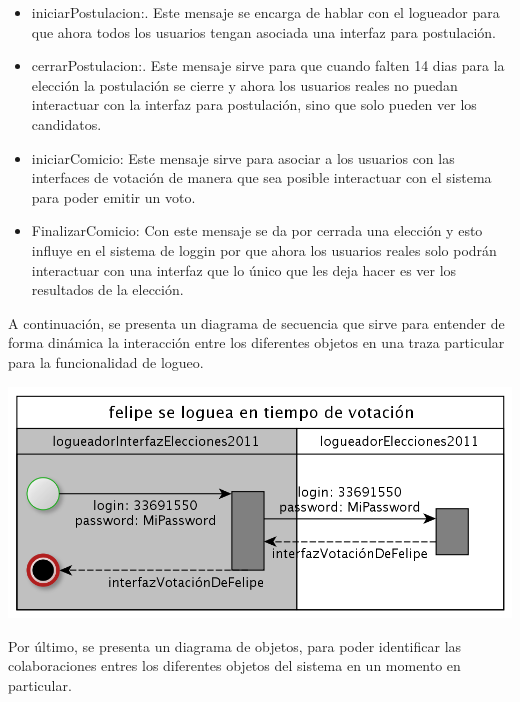 \begin{itemize}
\item iniciarPostulacion:. Este mensaje se encarga de hablar con el logueador para que ahora todos los usuarios tengan asociada una interfaz para postulaci\'on.
\item cerrarPostulacion:. Este mensaje sirve para que cuando falten 14 dias para la elecci\'on la postulaci\'on se cierre y ahora los usuarios reales no puedan interactuar con la interfaz para postulaci\'on, sino que solo pueden ver los candidatos.
\item iniciarComicio: Este mensaje sirve para asociar a los usuarios con las interfaces de votaci\'on de manera que sea posible interactuar con el sistema para poder emitir un voto.
\item FinalizarComicio: Con este mensaje se da por cerrada una elecci\'on y esto influye en el sistema de loggin por que ahora los usuarios reales solo podr\'an interactuar con una interfaz que lo \'unico que les deja hacer es ver los resultados de la elecci\'on. 
\end{itemize}




\bigskip

A continuaci\'on, se presenta un diagrama de secuencia que sirve para entender de forma din\'amica la interacci\'on entre los diferentes objetos en una traza particular para la funcionalidad de logueo.

\begin{center}
\includegraphics[scale=0.3]{diagramas/diagramaSecuenciaSeLogueaUnAlumno.png}
\end{center}





Por \'ultimo, se presenta un diagrama de objetos, para poder identificar las colaboraciones entres los diferentes objetos del sistema en un momento en particular.

